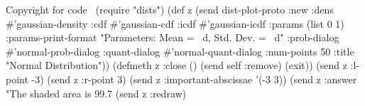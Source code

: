 \nwenddocs{}\endmoddef
\LA{}Copyright for code~{\nwtagstyle{}}\RA{}
(require "dists")
(def z 
  (send dist-plot-proto :new
        :dens #'gaussian-density
        :cdf #'gaussian-cdf
        :icdf #'gaussian-icdf
        :params (list 0 1)
        :params-print-format "Parameters: Mean = ~d, Std. Dev. = ~d"
        :prob-dialog #'normal-prob-dialog
        :quant-dialog #'normal-quant-dialog
        :num-points 50
        :title "Normal Distribution"))
(defmeth z :close () (send self :remove) (exit))
(send z :l-point -3)
(send z :r-point 3)
(send z :important-abscissae '(-3 3))
(send z :answer "The shaded area is 99.7%
(send z :redraw)
\eatline
